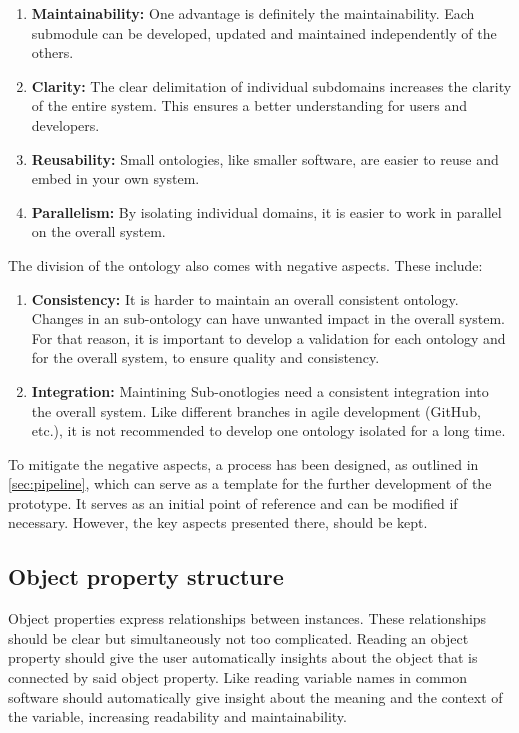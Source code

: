 \documentclass[
  a4paper,  %
  twoside,  %
  bibliography=totoc,
  headsepline,
  cleardoublepage=empty,
  parskip=half,
  draft=false
]{scrbook}
\begin{document}
\begin{enumerate}
    \item \textbf{Maintainability:} One advantage is definitely the maintainability. Each submodule can be developed, updated and maintained independently of the others. 
    \item \textbf{Clarity:} The clear delimitation of individual subdomains increases the clarity of the entire system. This ensures a better understanding for users and developers.
    \item \textbf{Reusability: } Small ontologies, like smaller software, are easier to reuse and embed in your own system.
    \item \textbf{Parallelism: } By isolating individual domains, it is easier to work in parallel on the overall system. 
\end{enumerate}

The division of the ontology also comes with negative aspects. These include:

\begin{enumerate}
    \item \textbf{Consistency: } It is harder to maintain an overall consistent ontology. Changes in an sub-ontology can have unwanted impact in the overall system. For that reason, it is important to develop a validation for each ontology and for the overall system, to ensure quality and consistency. 
    \item \textbf{Integration: } Maintining Sub-onotlogies need a consistent integration into the overall system. Like different branches in agile development (GitHub, etc.), it is not recommended to develop one ontology isolated for a long time. 
\end{enumerate}

To mitigate the negative aspects, a process has been designed, as outlined in \ref{sec:pipeline}, which can serve as a template for the further development of the prototype. It serves as an initial point of reference and can be modified if necessary. However, the key aspects presented there, should be kept.

\subsection{Object property structure}\label{sec:objectproperty_structure}

Object properties express relationships between instances. These relationships should be clear but simultaneously not too complicated. Reading an object property should give the user automatically insights about the object that is connected by said object property. Like reading variable names in common software should automatically give insight about the meaning and the context of the variable, increasing readability and maintainability. \\
\end{document}
